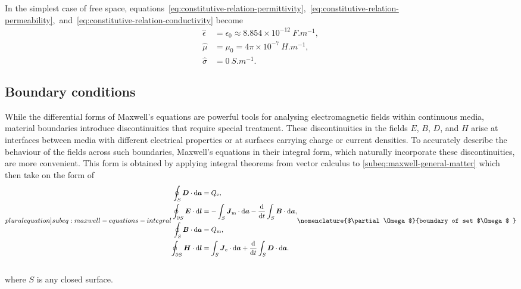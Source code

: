 \documentclass[11pt,a4paper,twoside,openany]{report}
\begin{document}
\begin{example}
    In the simplest case of free space, equations~\eqref{eq:constitutive-relation-permittivity},~\eqref{eq:constitutive-relation-permeability},~and~\eqref{eq:constitutive-relation-conductivity} become
    \begin{subequations}
        \begin{align}
            \hat\epsilon &= \epsilon_0 \approx 8.854\times 10^{-12}\ \unit{F.m^{-1}},
        \\
            \hat\mu &= \mu_0 = 4\pi\times 10^{-7}\ \unit{H.m^{-1}},
        \\
            \hat\sigma &= 0\ \unit{S.m^{-1}}.
        \end{align}
    \end{subequations}
\end{example}

\subsection{Boundary conditions}
While the differential forms of Maxwell's equations are powerful tools for analysing electromagnetic fields within continuous media, material boundaries introduce discontinuities that require special treatment. These discontinuities in the fields $E$, $B$, $D$, and $H$ arise at interfaces between media with different electrical properties or at surfaces carrying charge or current densities. To accurately describe the behaviour of the fields across such boundaries, Maxwell's equations in their integral form, which naturally incorporate these discontinuities, are more convenient. This form is obtained by applying integral theorems from vector calculus to \cref{subeq:maxwell-general-matter} which then take on the form of\\
\begin{subequations}
    \index{boundary conditions}
    \label[pluralequation]{subeq:maxwell-equations-integral}
    \noindent\centering
    \begin{align}
        \label{eq:maxwell-equations-integral-div-d}
        \oint_S \vec D \cdot \d\vec a &= Q_{\mathrm{e}},
    \\
        \label{eq:maxwell-equations-integral-curl-e}
        \oint_{\partial S} \vec E \cdot \d\vec l &= -\int_S \vec J_{\mathrm m} \cdot \d\vec a - \frac{\d}{\d t}\int_S \vec B \cdot \d\vec a,
    \\
        \label{eq:maxwell-equations-integral-div-b}
        \oint_S \vec B \cdot \d\vec a &= Q_{\mathrm{m}},
    \\
        \label{eq:maxwell-equations-integral-curl-h}
        \oint_{\partial S} \vec H \cdot \d\vec l &= \int_S \vec J_{\mathrm e} \cdot \d\vec a + \frac{\d}{\d t}\int_S \vec D \cdot \d\vec a.
    \end{align}
    \nomenclature{$\partial\Omega$}{boundary of set $\Omega$ }%
\end{subequations}\\
where $S$ is any closed surface.
\end{document}
